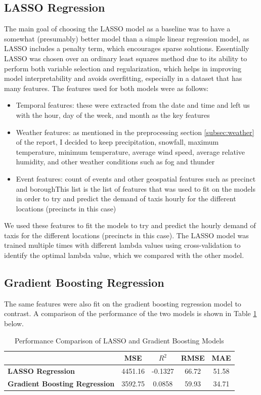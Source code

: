 \documentclass[11pt]{article}
\begin{document}
\subsection{LASSO Regression}
The main goal of choosing the LASSO model as a baseline was to have a somewhat (presumably) better model than a simple linear regression model, as LASSO includes a penalty term, which encourages sparse solutions. Essentially LASSO was chosen over an ordinary least squares method due to its ability to perform both variable selection and regularization, which helps in improving model interpretability and avoids overfitting, especially in a dataset that has many features.
The features used for both models were as follows:
\begin{itemize}
    \item Temporal features: these were extracted from the date and time and left us with the hour, day of the week, and month as the key features
    \item Weather features: as mentioned in the preprocessing section \ref{subsec:weather} of the report, I decided to keep precipitation, snowfall, maximum temperature, minimum temperature, average wind speed, average relative humidity, and other weather conditions such as fog and thunder
    \item Event features: count of events and other geospatial features such as precinct and boroughThis list is the list of features that was used to fit on the models in order to try and predict the demand of taxis hourly for the different locations (precincts in this case)
\end{itemize}

We used these features to fit the models to try and predict the hourly demand of taxis for the different locations (precincts in this case). 
The LASSO model was trained multiple times with different lambda values using cross-validation to identify the optimal lambda value, which we compared with the other model.


\subsection{Gradient Boosting Regression}
The same features were also fit on the gradient boosting regression model to contrast.
A comparison of the performance of the two models is shown in Table \ref{tab:model_comparison} below.

\begin{table}[h]
    \centering
    \begin{tabular}{lcccc}
        \hline
        & \textbf{MSE} & \textbf{$R^2$} & \textbf{RMSE} & \textbf{MAE} \\
        \hline
        \textbf{LASSO Regression} & 4451.16 & -0.1327 & 66.72 & 51.58 \\
        \textbf{Gradient Boosting Regression} & 3592.75 & 0.0858 & 59.93 & 34.71 \\
        \hline
    \end{tabular}
    \caption{Performance Comparison of LASSO and Gradient Boosting Models}
    \label{tab:model_comparison}
\end{table}
\end{document}
